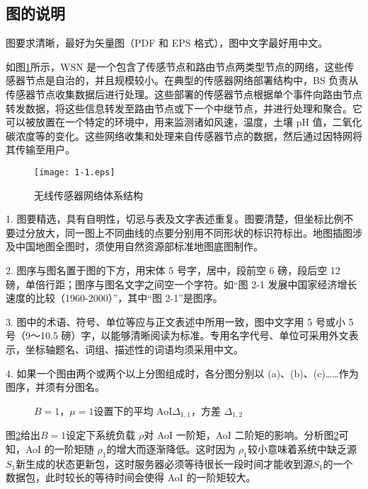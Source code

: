 \subsection{图的说明}

图要求清晰，最好为矢量图（PDF 和 EPS 格式），图中文字最好用中文。

如图\ref{Fig1-1}所示，WSN 是一个包含了传感节点和路由节点两类型节点的网络，这些传感器节点是自治的，并且规模较小。在典型的传感器网络部署结构中，BS 负责从传感器节点收集数据后进行处理。这些部署的传感器节点根据单个事件向路由节点转发数据，将这些信息转发至路由节点或下一个中继节点，并进行处理和聚合。它可以被放置在一个特定的环境中，用来监测诸如风速，温度，土壤 pH 值，二氧化碳浓度等的变化。这些网络收集和处理来自传感器节点的数据，然后通过因特网将其传输至用户。

\begin{figure}[htbp]
	\vspace*{6pt}
	\centering
	\texttt{[image: 1-1.eps]}
	\caption{无线传感器网络体系结构}\label{Fig1-1}
	\vspace*{10pt}
\end{figure}


\textcolor[rgb]{1.00,0.00,0.00}{1. 图要精选，具有自明性，切忌与表及文字表述重复。图要清楚，但坐标比例不要过分放大，同一图上不同曲线的点要分别用不同形状的标识符标出。地图插图涉及中国地图全图时，须使用自然资源部标准地图底图制作。}

\textcolor[rgb]{1.00,0.00,0.00}{2. 图序与图名置于图的下方，用宋体 5 号字，居中，段前空 6 磅，段后空 12 磅，单倍行距；图序与图名文字之间空一个字符。如“图 2-1 发展中国家经济增长速度的比较（1960-2000）”，其中“图 2-1”是图序。}

\textcolor[rgb]{1.00,0.00,0.00}{3. 图中的术语、符号、单位等应与正文表述中所用一致，图中文字用 5 号或小 5 号（9～10.5 磅）字，以能够清晰阅读为标准。专用名字代号、单位可采用外文表示，坐标轴题名、词组、描述性的词语均须采用中文。}

\textcolor[rgb]{1.00,0.00,0.00}{4. 如果一个图由两个或两个以上分图组成时，各分图分别以 (a)、(b)、(c)……作为图序，并须有分图名。}


\begin{figure}[htbp]
	\vspace*{6pt}
	\centering
	\vspace{1pt}
	\caption{$B = 1$，$\mu  = 1$设置下的平均 AoI${\Delta _{1,1}}$，方差 ${\Delta _{1,2}}$}\label{Fig1-2}
	\vspace*{10pt}
\end{figure}
图\ref{Fig1-2}给出$B = 1$设定下系统负载 $\rho$对 AoI 一阶矩，AoI 二阶矩的影响。分析图\ref{Fig1-2}可知，AoI 的一阶矩随 ${\rho_1}$的增大而逐渐降低。这时因为 ${\rho _1}$较小意味着系统中缺乏源${S_1}$新生成的状态更新包，这时服务器必须等待很长一段时间才能收到源${S_1}$的一个数据包，此时较长的等待时间会使得 AoI 的一阶矩较大。




